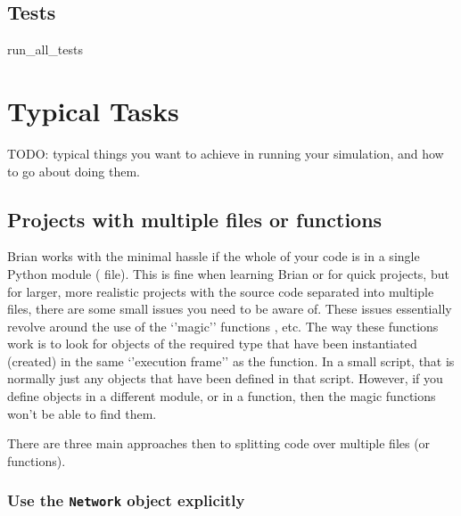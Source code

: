 \documentclass[letterpaper,10pt,english]{manual}
\begin{document}
\resetcurrentobjects
\hypertarget{--doc-reference-tests}{}

\hypertarget{index-146}{}\section{Tests}

\hypertarget{brian.run_all_tests}{}\begin{funcdesc}{run\_all\_tests}{}\end{funcdesc}

\resetcurrentobjects
\hypertarget{--doc-typicaltasks}{}

\chapter{Typical Tasks}

TODO: typical things you want to achieve in running your simulation,
and how to go about doing them.

\resetcurrentobjects
\hypertarget{--doc-tasks_multiplefiles}{}

\hypertarget{projects-with-multiple-files}{}\section{Projects with multiple files or functions}

Brian works with the minimal hassle if the whole of your code is in a
single Python module ( file). This is fine when learning Brian
or for quick projects, but for larger, more realistic projects with
the source code separated into multiple files, there are some small
issues you need to be aware of. These issues essentially revolve
around the use of the `'magic'' functions \hyperlink{brian.run}{}, etc. The way
these functions work is to look for objects of the required type that
have been instantiated (created) in the same `'execution frame'' as
the \hyperlink{brian.run}{} function. In a small script, that is normally just
any objects that have been defined in that script. However, if you
define objects in a different module, or in a function, then the
magic functions won't be able to find them.

There are three main approaches then to splitting code over multiple
files (or functions).

\hypertarget{index-153}{}\subsection{Use the \texttt{Network} object explicitly}
\end{document}

